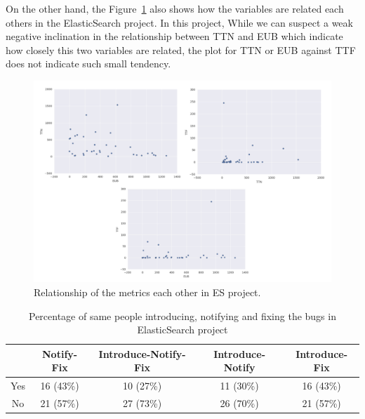 \documentclass[10pt, conference]{IEEEtran}
\begin{document}
On the other hand, the Figure~\ref{fig:graph1} also shows how the variables are related each others in the ElasticSearch project. In this project, While we can suspect a weak negative inclination in the relationship between TTN and EUB which indicate how closely this two variables are related, the plot for TTN or EUB against TTF does not indicate such small tendency.
\begin{figure}[ht]
\centering
\includegraphics[width=\columnwidth]{DistributionES_b.png}
\caption{Relationship of the metrics each other in ES project. }
\label{fig:graph1}       %
\end{figure}
 

\begin{table}[!t]
\renewcommand{\arraystretch}{1.3}
\label{tableII}
\centering
\caption{Percentage of same people introducing, notifying and fixing the bugs in ElasticSearch project}
\begin{tabular}{|c||c||c||c||c| }
\hline
  & Notify-Fix & Introduce-Notify-Fix & Introduce-Notify & Introduce-Fix \\
\hline
Yes & 16 (43\%) & 10 (27\%) & 11 (30\%) & 16 (43\%) \\
\hline
No & 21 (57\%) & 27 (73\%) & 26 (70\%) & 21 (57\%) \\
\hline
\end{tabular}
\end{table}
\end{document}
